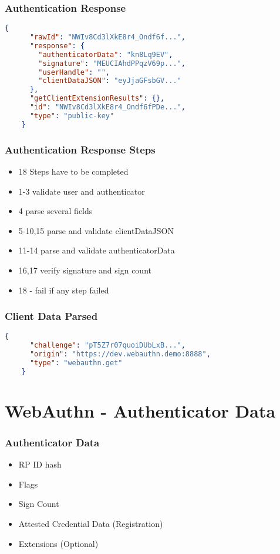 \documentclass{beamer}
\begin{document}
\begin{frame}[fragile]
  \frametitle{Authentication Response}
  \begin{lstlisting}[language=json]
    {
      "rawId": "NWIv8Cd3lXkE8r4_Ondf6f...",
      "response": {
        "authenticatorData": "kn8Lq9EV",
        "signature": "MEUCIAhdPPqzV69p...",
        "userHandle": "",
        "clientDataJSON": "eyJjaGFsbGV..."
      },
      "getClientExtensionResults": {},
      "id": "NWIv8Cd3lXkE8r4_Ondf6fPDe...",
      "type": "public-key"
    }
  \end{lstlisting}
\end{frame}

\begin{frame}[fragile]
  \frametitle{Authentication Response Steps}
  \begin{itemize}
    \item 18 Steps have to be completed
    \item 1-3 validate user and authenticator
    \item 4 parse several fields
    \item 5-10,15 parse and validate clientDataJSON
    \item 11-14 parse and validate authenticatorData
    \item 16,17 verify signature and sign count
    \item 18 - fail if any step failed
  \end{itemize}
\end{frame}

\begin{frame}[fragile]
  \frametitle{Client Data Parsed}
  \begin{lstlisting}[language=json]
    {
      "challenge": "pT5Z7r07quoiDUbLxB...",
      "origin": "https://dev.webauthn.demo:8888",
      "type": "webauthn.get"
    }
  \end{lstlisting}
\end{frame}

\section{WebAuthn - Authenticator Data}

\begin{frame}[fragile]
  \frametitle{Authenticator Data}
  \begin{itemize}
    \item RP ID hash
    \item Flags
    \item Sign Count
    \item Attested Credential Data (Registration)
    \item Extensions (Optional)
  \end{itemize}
\end{frame}
\end{document}

